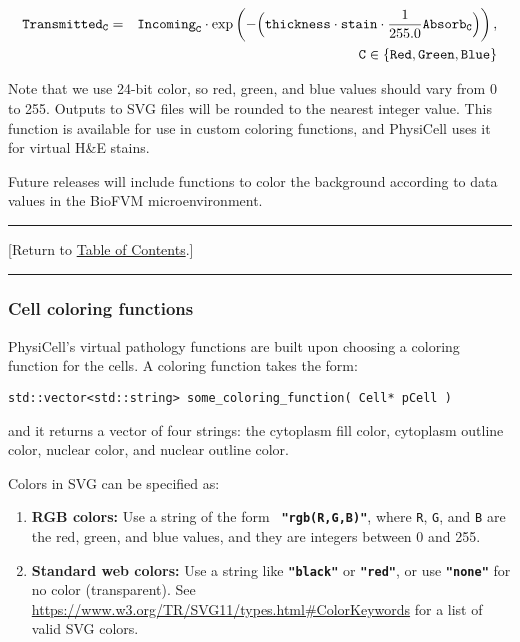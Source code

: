 \documentclass[12pt]{article}
\newcommand{\braces}[1]{\left\{#1\right\}}
\newcommand{\beqa}{\begin{eqnarray}}
\newcommand{\eeqa}{\end{eqnarray}}
\renewcommand{\v}{\verb}
\newcommand{\smallcode}[1]{\textbf{\texttt{#1}}}
\newcommand{\blue}[1]{\textcolor{blue}{#1}}
\newcommand{\DONE}{}%
\newcommand{\TOClink}{\begin{center}\hrule\vskip-5pt\phantom{.}\hfill[Return to \hyperlink{TOC}{Table of Contents}.]\hfill\phantom{.}\vskip3pt\hrule\end{center}}
\begin{document}
\begin{enumerate}
\beqa
\texttt{Transmitted}_\texttt{C} & = & \texttt{Incoming}_\texttt{C} 
\cdot 
\exp\left( 
 -\Bigl( \texttt{thickness} 
\cdot \texttt{stain} \cdot \frac{1}{255.0} \texttt{Absorb}_\texttt{C} \Bigr) \right), 
\nonumber \\
 && 
 \phantom{ } \hfill 
\texttt{C} \in \braces{ \texttt{Red}, \texttt{Green}, \texttt{Blue} }
\eeqa

Note that we use 24-bit color, so red, green, and blue values should vary from 
0 to 255. Outputs to SVG files will be rounded to the nearest integer value. 
This function is available for use in custom coloring functions, and PhysiCell 
uses it for virtual H\&E stains. 

\end{enumerate}

Future releases will include functions to color the background according to data values in 
the BioFVM microenvironment. 

\TOClink

\subsubsection{Cell coloring functions \DONE}
\label{sec:Pathology_Coloring}

PhysiCell's virtual pathology functions are built upon choosing a coloring 
function for the cells. A coloring function takes the form: 
%
\begin{verbatim}
std::vector<std::string> some_coloring_function( Cell* pCell )
\end{verbatim}
%
and it returns a vector of four strings: the cytoplasm fill color, cytoplasm outline color, 
nuclear color, and nuclear outline color. 

Colors in SVG can be specified as: 
\begin{enumerate}
\item 
\textbf{RGB colors:} Use a string of the form 
\smallcode{ "rgb(R,G,B)"}, where \v|R|, \v|G|, and \v|B| are the red, 
green, and blue values, and they are integers between 0 and 255. 

\item 
\textbf{Standard web colors:} Use a string like \smallcode{"black"} or 
\smallcode{"red"}, or use \smallcode{"none"} for no color (transparent). 
See 
\href{https://www.w3.org/TR/SVG11/types.html#ColorKeywords}{https://www.w3.org/TR/SVG11/types.html\#ColorKeywords} for a 
list of valid SVG colors. 

\end{enumerate}
\end{document}
